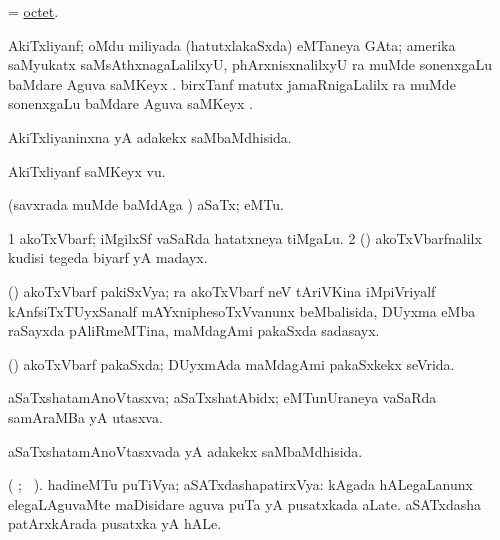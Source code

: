 \bentry
{}
\gl{\nA}
\bmng
= \hyperlink{octet}{octet}. 
\emng
\eentry

\bentry
{}
\gl{\nA}
\bmng
AkiTxliyanf; oMdu miliyada (hatutxlakaSxda) eMTaneya GAta; amerika saMyukatx saMsAthxnagaLalilxyU, phArxnisxnalilxyU ra muMde  sonenxgaLu baMdare Aguva saMKeyx . birxTanf matutx jamaRnigaLalilx ra muMde  sonenxgaLu baMdare Aguva saMKeyx . 
\emng
\eentry

\bentry
{}
\gl{\gu}
\bmng
AkiTxliyaninxna yA adakekx saMbaMdhisida. 
\emng
\eentry

\bentry
{}
\gl{\nA}
\bmng
AkiTxliyanf saMKeyx \mo vu. 
\emng
\eentry

\bentry
{}
\gl{\sapUpa}
\bmng
(savxrada muMde baMdAga ) aSaTx; eMTu. 
\emng
\eentry

\bentry
{}
\gl{\nA}
\bmng
\bnum
\num{1} akoTxVbarf; iMgilxSf vaSaRda hatatxneya tiMgaLu. 
\num{2} (\pArxparx) akoTxVbarfnalilx kudisi tegeda biyarf yA madayx. 
\enum
\emng
\eentry

\bentry
{}
\gl{\nA}
\bmng
(\ca) akoTxVbarf pakiSxVya; ra akoTxVbarf neV tAriVKina iMpiVriyalf kAnfsiTxTUyxSanalf mAYxniphesoTxVvanunx beMbalisida, DUyxma eMba raSayxda pAliRmeMTina, maMdagAmi pakaSxda sadasayx. 
\emng
\eentry

\bentry
{}
\gl{\gu}
\bmng
(\ca) akoTxVbarf pakaSxda; DUyxmAda maMdagAmi pakaSxkekx seVrida. 
\emng
\eentry

\bentry
{}
\gl{\nA}
\bmng
aSaTxshatamAnoVtasxva; aSaTxshatAbidx; eMTunUraneya vaSaRda samAraMBa yA utasxva. 
\emng
\eentry

\bentry
{}
\gl{\gu}
\bmng
aSaTxshatamAnoVtasxvada yA adakekx saMbaMdhisida. 
\emng
\eentry

\bentry
{}
\gl{\nA}
\bmng
(\saMkiSx {} ; \bava\ ). hadineMTu puTiVya; aSATxdashapatirxVya: 
\banum
{} kAgada hALegaLanunx  elegaLAguvaMte maDisidare aguva puTa yA pusatxkada aLate. 
 aSATxdasha patArxkArada pusatxka yA hALe. 
\eanum
\emng
\eentry

